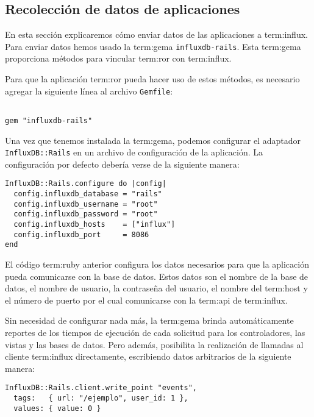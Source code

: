 \subsection{Recolección de datos de aplicaciones}
\label{aplicaciones}

En  esta sección explicaremos cómo enviar datos de las aplicaciones  a
\gls{term:influx}. Para enviar datos hemos usado la \gls{term:gema}
\texttt{influxdb-rails}. Esta \gls{term:gema} proporciona métodos para vincular
\gls{term:ror} con \gls{term:influx}.

Para que la aplicación \gls{term:ror} pueda hacer uso de estos métodos, es
necesario agregar la siguiente línea al archivo \texttt{Gemfile}:

\begin{lstlisting}

gem "influxdb-rails"

\end{lstlisting}

Una vez que tenemos instalada la \gls{term:gema}, podemos configurar el
adaptador \texttt{InfluxDB::Rails} en un archivo de configuración de la
aplicación. La configuración por defecto debería verse de la siguiente manera:

\begin{lstlisting}
InfluxDB::Rails.configure do |config|
  config.influxdb_database = "rails"
  config.influxdb_username = "root"
  config.influxdb_password = "root"
  config.influxdb_hosts    = ["influx"]
  config.influxdb_port     = 8086
end
\end{lstlisting}

El código \gls{term:ruby} anterior configura los datos necesarios para que la aplicación
pueda comunicarse con la base de datos. Estos datos son el nombre de la base de
datos, el nombre de usuario, la contraseña del usuario, el nombre del
\gls{term:host} y el número de puerto por el cual comunicarse con la
\gls{term:api} de \gls{term:influx}.

Sin necesidad de configurar nada más, la \gls{term:gema} brinda automáticamente
reportes de los tiempos de ejecución de cada solicitud  para los
controladores, las vistas y las bases de datos. Pero además, posibilita la
realización de llamadas al cliente \gls{term:influx} directamente, escribiendo
datos arbitrarios de la siguiente manera:

\begin{lstlisting}
InfluxDB::Rails.client.write_point "events",
  tags:   { url: "/ejemplo", user_id: 1 },
  values: { value: 0 }
\end{lstlisting}

